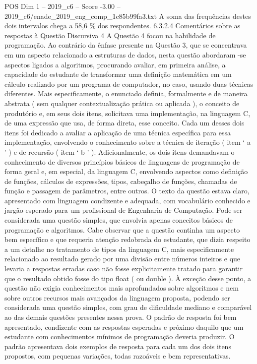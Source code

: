 \begin{textsample}{POS Dim 1 – 2019\_c6 – Score -3.00 – 2019\_c6/enade\_2019\_eng\_comp\_1c85b99fa3.txt}
A soma das frequências destes dois intervalos chega a 58,6 \% dos respondentes. 6.3.2.4 Comentários sobre as respostas à Questão Discursiva 4 A Questão 4 focou na habilidade de programação.
Ao contrário da ênfase presente na Questão 3, que se concentrava em um aspecto relacionado a estruturas de dados, nesta questão abordaram -se aspectos ligados a algoritmos, procurando avaliar, em primeira análise, a capacidade do estudante de transformar uma definição matemática em um cálculo realizado por um programa de computador, no caso, usando duas técnicas diferentes.
Mais especificamente, o enunciado definia, formalmente e de maneira abstrata ( sem qualquer contextualização prática ou aplicada ), o conceito de produtório e, em seus dois itens, solicitava uma implementação, na linguagem C, de uma expressão que usa, de forma direta, esse conceito.
Cada um desses dois itens foi dedicado a avaliar a aplicação de uma técnica específica para essa implementação, envolvendo o conhecimento sobre a técnica de iteração ( item ‘ a ’ ) e de recursão ( item ‘ b ’ ).
Adicionalmente, os dois itens demandavam o conhecimento de diversos princípios básicos de linguagens de programação de forma geral e, em especial, da linguagem C, envolvendo aspectos como definição de funções, cálculos de expressões, tipos, cabeçalho de funções, chamadas de função e passagem de parâmetros, entre outros.
O texto da questão estava claro, apresentado com linguagem condizente e adequada, com vocabulário conhecido e jargão esperado para um profissional de Engenharia de Computação.
Pode ser considerada uma questão simples, que envolvia apenas conceitos básicos de programação e algoritmos.
Cabe observar que a questão continha um aspecto bem específico e que requeria atenção redobrada do estudante, que dizia respeito a um detalhe no tratamento de tipos da linguagem C, mais especificamente relacionado ao resultado gerado por uma divisão entre números inteiros e que levaria a respostas erradas caso não fosse explicitamente tratado para garantir que o resultado obtido fosse do tipo float ( ou double ).
À exceção desse ponto, a questão não exigia conhecimentos mais aprofundados sobre algoritmos e nem sobre outros recursos mais avançados da linguagem proposta, podendo ser considerada uma questão simples, com grau de dificuldade mediano e comparável ao das demais questões presentes nessa prova.
O padrão de resposta foi bem apresentado, condizente com as respostas esperadas e próximo daquilo que um estudante com conhecimentos mínimos de programação deveria produzir.
O padrão apresentava dois exemplos de resposta para cada um dos dois itens propostos, com pequenas variações, todas razoáveis e bem representativas.

\end{textsample}
